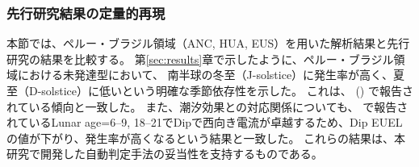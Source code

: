 \subsubsection{先行研究結果の定量的再現}
\label{sec:discussion_reproduction}

本節では、ペルー・ブラジル領域（ANC, HUA, EUS）を用いた解析結果と先行研究の結果を比較する。
第\ref{sec:results}章で示したように、ペルー・ブラジル領域における未発達型において、
南半球の冬至（J-solstice）に発生率が高く、夏至（D-solstice）に低いという明確な季節依存性を示した。
これは、\citeauthor{Ikesue2024} (\citeyear{Ikesue2024}) で報告されている傾向と一致した。
また、潮汐効果との対応関係についても、
\citeauthor{Fujimoto2019} \citeyear{Fujimoto2019}で報告されているLunar age=6--9, 
18--21でDipで西向き電流が卓越するため、Dip EUELの値が下がり、発生率が高くなるという結果と一致した。
これらの結果は、本研究で開発した自動判定手法の妥当性を支持するものである。
